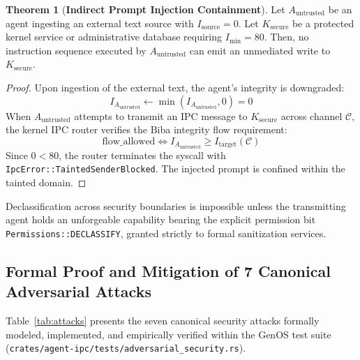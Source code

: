 \documentclass[10pt,journal,compsoc]{IEEEtran}
\theoremstyle{definition}
\newtheorem{theorem}{Theorem}
\begin{document}
\begin{theorem}[\textbf{Indirect Prompt Injection Containment}]
Let $A_{\text{untrusted}}$ be an agent ingesting an external text source with $I_{\text{source}} = 0$. Let $K_{\text{secure}}$ be a protected kernel service or administrative database requiring $I_{\text{min}} = 80$. Then, no instruction sequence executed by $A_{\text{untrusted}}$ can emit an unmediated write to $K_{\text{secure}}$.
\end{theorem}
\begin{proof}
Upon ingestion of the external text, the agent's integrity is downgraded:
$$I_{A_{\text{untrusted}}} \leftarrow \min(I_{A_{\text{untrusted}}}, 0) = 0$$
When $A_{\text{untrusted}}$ attempts to transmit an IPC message to $K_{\text{secure}}$ across channel $\mathcal{C}$, the kernel IPC router verifies the Biba integrity flow requirement:
$$\text{flow\_allowed} \iff I_{A_{\text{untrusted}}} \ge I_{\text{target}}(\mathcal{C})$$
Since $0 < 80$, the router terminates the syscall with \texttt{IpcError::\allowbreak TaintedSenderBlocked}. The injected prompt is confined within the tainted domain.
\end{proof}

Declassification across security boundaries is impossible unless the transmitting agent holds an unforgeable capability bearing the explicit permission bit \texttt{Permissions::\allowbreak DECLASSIFY}, granted strictly to formal sanitization services.

\subsection{Formal Proof and Mitigation of 7 Canonical Adversarial Attacks}
Table~\ref{tab:attacks} presents the seven canonical security attacks formally modeled, implemented, and empirically verified within the GenOS test suite (\texttt{crates/\allowbreak agent-ipc/\allowbreak tests/\allowbreak adversarial\_security.rs}).
\end{document}
